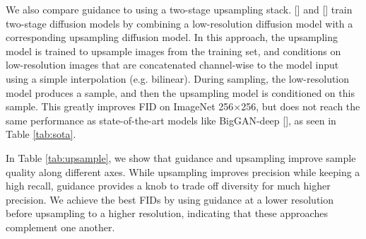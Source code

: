 \documentclass{article}
\newcommand{\shortcite}[1]{[\citenum{#1}]}
\newcommand{\namecite}[1]{\citeauthor{#1} [\citenum{#1}]}
\begin{document}
We also compare guidance to using a two-stage upsampling stack. \namecite{improved} and \namecite{sr3} train two-stage diffusion models by combining a low-resolution diffusion model with a corresponding upsampling diffusion model. In this approach, the upsampling model is trained to upsample images from the training set, and conditions on low-resolution images that are concatenated channel-wise to the model input using a simple interpolation (e.g. bilinear). During sampling, the low-resolution model produces a sample, and then the upsampling model is conditioned on this sample. This greatly improves FID on ImageNet 256$\times$256, but does not reach the same performance as state-of-the-art models like BigGAN-deep \shortcite{improved,sr3}, as seen in Table \ref{tab:sota}. 

In Table \ref{tab:upsample}, we show that guidance and upsampling improve sample quality along different axes. While upsampling improves precision while keeping a high recall, guidance provides a knob to trade off diversity for much higher precision. We achieve the best FIDs by using guidance at a lower resolution before upsampling to a higher resolution, indicating that these approaches complement one another.
\end{document}
